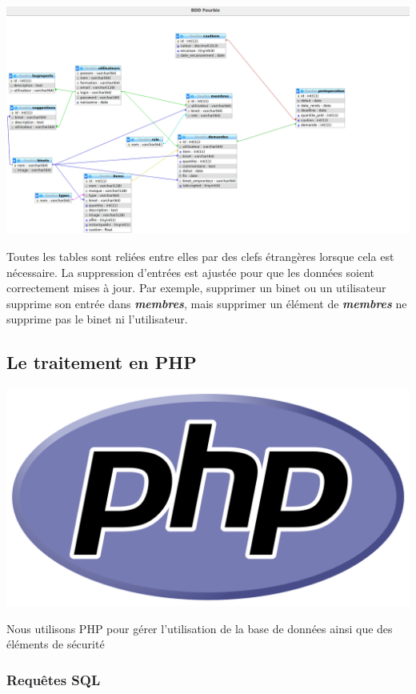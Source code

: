 \documentclass[titlepage,11pt,a4paper]{article}
\begin{document}
\begin{center}
\includegraphics[scale=0.3]{BDD_FourbiX.png}
\end{center}

Toutes les tables sont reliées entre elles par des clefs étrangères lorsque cela est nécessaire. La suppression d'entrées est ajustée pour que les données soient correctement mises à jour. Par exemple, supprimer un binet ou un utilisateur supprime son entrée dans \textbf{\emph{membres}}, mais supprimer un élément de \textbf{\emph{membres}} ne supprime pas le binet ni l'utilisateur.

\subsection{Le traitement en PHP}

\begin{center}
\includegraphics[scale=0.05]{php.png}
\end{center}

Nous utilisons PHP pour gérer l'utilisation de la base de données ainsi que des éléments de sécurité

\subsubsection{Requêtes SQL}
\end{document}
